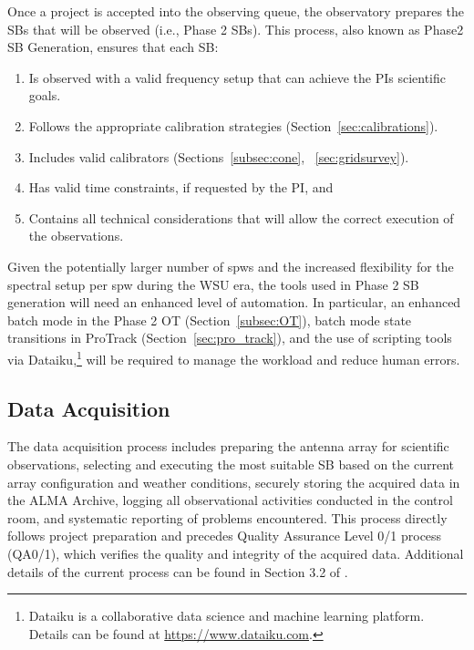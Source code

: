 Once a project is accepted into the observing queue, the observatory prepares the \acp{SB} that will be observed (i.e., Phase 2 \acp{SB}). This process, also known as Phase2 SB Generation, ensures that each \ac{SB}: 
\begin{enumerate}[label=\roman*]
  \item Is observed with a valid frequency setup that can achieve the \acp{PI} scientific goals.  
  \item Follows the appropriate calibration strategies (Section~\ref{sec:calibrations}).
  \item Includes valid calibrators (Sections~\ref{subsec:cone}, ~\ref{sec:gridsurvey}).
  \item Has valid time constraints, if requested by the \ac{PI}, and 
  \item Contains all technical considerations that will allow the correct execution of the observations. 
\end{enumerate}

Given the potentially larger number of \acp{spw} and the increased flexibility for the spectral setup per \ac{spw} during the WSU era, the tools used in Phase 2 SB generation will need an enhanced level of automation. In particular, an enhanced batch mode in the Phase 2 OT (Section~\ref{subsec:OT}), batch mode state transitions in \ac{ProTrack} (Section~\ref{sec:pro_track}), and the use of scripting tools via Dataiku,\footnote{Dataiku is a collaborative data science and machine learning platform. Details can be found at \url{https://www.dataiku.com}.} will be required to manage the workload and reduce human errors.


\subsection{Data Acquisition}
\label{sec:daq}

The data acquisition process includes preparing the antenna array for scientific observations, selecting and executing the most suitable \ac{SB} based on the current array configuration and weather conditions, securely storing the acquired data in the ALMA Archive, logging all observational activities conducted in the control room, and systematic reporting of problems encountered. This process directly follows project preparation and precedes  Quality Assurance Level 0/1 process (QA0/1), which verifies the quality and integrity of the acquired data.  Additional details of the current process can be found in Section 3.2 of \cite{CSA-IA}.

